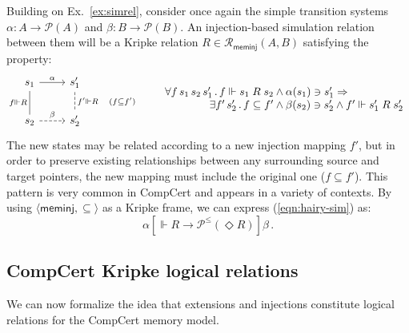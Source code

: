 \documentclass[acmsmall,screen,review,anonymous]{acmart}
\newcommand{\kw}[1]{\ensuremath{ \mathsf{#1} }}
\newcommand{\ifr}[1]{\mathrel{[{#1}]}}
\begin{document}
\begin{example} \label{ex:sim} %
Building on Ex.~\ref{ex:simrel},
consider once again the simple transition systems
$\alpha : A \rightarrow \mathcal{P}(A)$ and
$\beta : B \rightarrow \mathcal{P}(B)$.
An injection-based simulation relation between them
will be a Kripke relation
$R \in \mathcal{R}_\kw{meminj}(A, B)$
satisfying the property:
\begin{equation}
    \label{eqn:hairy-sim}
  \begin{tikzcd}[scale=0.8]
    s_1 \arrow[r, "\alpha"]
        \arrow[d, dash, "f \Vdash R"'] &
    s_1' \arrow[d, dashed, dash, "f' \Vdash R \quad (f \subseteq f')"] \\
    s_2 \arrow[r, dashed, "\beta"] &
    s_2'
  \end{tikzcd}
  \qquad
    \begin{array}{r@{}l}
    \forall f \, s_1 \, s_2 \, s_1' \,.\,
      f \Vdash s_1 \mathrel{R} s_2 &{} \wedge
      \alpha(s_1) \ni s_1' \Rightarrow \\
    \exists f' \, s_2' \,.\,
      f \subseteq f' &{} \wedge
      \beta(s_2) \ni s_2' \wedge
      f' \Vdash s_1' \mathrel{R} s_2'
    \end{array}
\end{equation}
The new states may be related according to
a new injection mapping $f'$,
but in order to preserve existing relationships
between any surrounding source and target pointers,
the new mapping must include
the original one ($f \subseteq f'$).
This pattern is very common in CompCert
and appears in a variety of contexts.
By using $\langle \kw{meminj}, {\subseteq} \rangle$
as a Kripke frame,
we can express
(\ref{eqn:hairy-sim}) as:
\[
  \alpha \ifr{\Vdash R \rightarrow \mathcal{P}^\le(\Diamond R)} \beta \,.
\]
\end{example}


\subsection{CompCert Kripke logical relations} \label{sec:cklrdef} %

We can now formalize the idea that
extensions and injections
constitute logical relations for the CompCert memory model.
\end{document}
